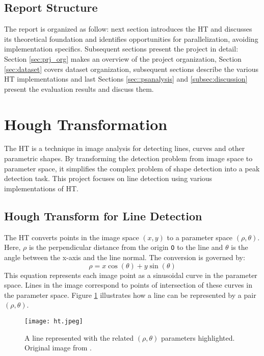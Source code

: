 \documentclass[conference]{IEEEtran}
\begin{document}
    \subsection{Report Structure}
    \label{sec:intro_rep_struct}
    
        The report is organized as follow: next section introduces the HT and discusses its theoretical foundation and identifies opportunities for parallelization, avoiding implementation specifics. Subsequent sections present the project in detail: Section \ref{sec:prj_org} makes an overview of the project organization, Section \ref{sec:dataset} covers dataset organization, subsequent sections describe the various HT implementations and last Sections \ref{sec::psanalysis} and \ref{subsec:discussion} present the evaluation results and discuss them.
        
\section{Hough Transformation}
\label{sec:HT}

    The HT is a technique in image analysis for detecting lines, curves and other parametric shapes. By transforming the detection problem from image space to parameter space, it simplifies the complex problem of shape detection into a peak detection task. This project focuses on line detection using various implementations of HT.
    
    \subsection{Hough Transform for Line Detection}
    \label{sec:ht_line_detection}
        The HT converts points in the image space $(x, y)$ to a parameter space $(\rho, \theta)$. Here, $\rho$ is the perpendicular distance from the origin \texttt{O} to the line and $\theta$ is the angle between the x-axis and the line normal. The conversion is governed by:
        \begin{equation}
        \label{eq::ht}
            \rho = x \cos(\theta) + y \sin(\theta)
        \end{equation}
        This equation represents each image point as a sinusoidal curve in the parameter space. Lines in the image correspond to points of intersection of these curves in the parameter space. Figure \ref{fig:ht} illustrates how a line can be represented by a pair $(\rho, \theta)$.
    
        \begin{figure}[htbp]
            \centering
            \texttt{[image: ht.jpeg]}
            \caption{A line represented with the related $(\rho, \theta)$ parameters highlighted. Original image from \cite{enwiki:1226870376}.}
            \label{fig:ht}
        \end{figure}
\end{document}
